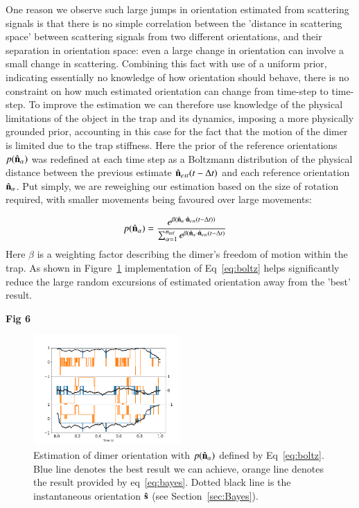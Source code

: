 \documentclass[final,  3p]{elsarticle}
\begin{document}
One reason we observe such large jumps in orientation estimated from scattering signals is that there is no simple correlation between the 'distance in scattering space' between scattering signals from two different orientations, and their separation in orientation space: even a large change in orientation can involve a small change in scattering. Combining this fact with use of a uniform prior, indicating essentially no knowledge of how orientation should behave, there is no constraint on how much estimated orientation can change from time-step to time-step. To improve the estimation we can therefore use knowledge of the physical limitations of the object in the trap and its dynamics, imposing a more physically grounded prior, accounting in this case for the fact that the motion of the dimer is limited due to the trap stiffness. Here the prior of the reference orientations $p(\hat{\bf n}_\alpha)$ was redefined at each time step as a Boltzmann distribution of the physical distance between the previous estimate $\hat{\bf n}_{est}(t-\Delta t)$ and each reference orientation $\hat{\bf n}_\alpha$. Put simply, we are reweighing our estimation based on the size of rotation required, with smaller movements being favoured over large movements:

\begin{align}
  p(\hat{\bf n}_\alpha)
  &=\frac{e^{\beta (\hat{\bf n}_\alpha 
  	\cdot \hat{\bf n}_{est}(t-\Delta t))}}
  {\sum_{\alpha=1}^{n_{\rm ref}}
	e^{\beta (\hat{\bf n}_\alpha 
	\cdot \hat{\bf n}_{est}(t-\Delta t)}}
	\label{eq:boltz}
\end{align}
Here $\beta$ is a weighting factor describing the dimer's freedom of motion within the trap. As shown in Figure~\ref{fig:biased} implementation of Eq~\eqref{eq:boltz} helps significantly reduce the large random excursions of estimated orientation away from the 'best' result. 

\begin{center}
	\bf{Fig 6}
\end{center}
\begin{figure}[h]
\centering
\includegraphics[width=0.5\textwidth]{./Images/fig8a.png}
\caption{\label{fig:biased}
%
Estimation of dimer orientation with $p(\hat{\bf n}_\alpha)$ defined
by Eq~\eqref{eq:boltz}.  Blue line denotes the best result we can
achieve, orange line denotes the result provided by eq~\ref{eq:bayes}.
Dotted black line is the instantaneous orientation $\hat{\bf s}$ (see Section~\ref{sec:Bayes}).
}
\end{figure} 
\end{document}
